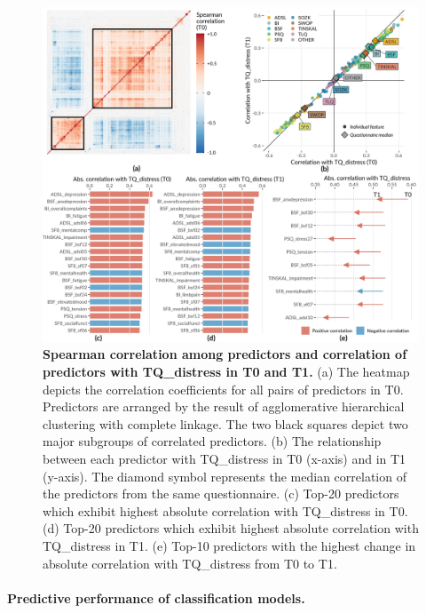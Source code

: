 \documentclass[
  oneside]{book}
\begin{document}
\begin{figure}[h]

{\centering \includegraphics[width=1\linewidth]{figures/09-cor} 

}

\caption{\textbf{Spearman correlation among predictors and correlation of predictors with TQ\_distress in T0 and T1.} (a) The heatmap depicts the correlation coefficients for all pairs of predictors in T0. Predictors are arranged by the result of agglomerative hierarchical clustering with complete linkage. The two black squares depict two major subgroups of correlated predictors. (b) The relationship between each predictor with TQ\_distress in T0 (x-axis) and in T1 (y-axis). The diamond symbol represents the median correlation of the predictors from the same questionnaire. (c) Top-20 predictors which exhibit highest absolute correlation with TQ\_distress in T0. (d) Top-20 predictors which exhibit highest absolute correlation with TQ\_distress in T1. (e) Top-10 predictors with the highest change in absolute correlation with TQ\_distress from T0 to T1.}\label{fig:09-cor}
\end{figure}

\paragraph*{Predictive performance of classification models.}
\end{document}
